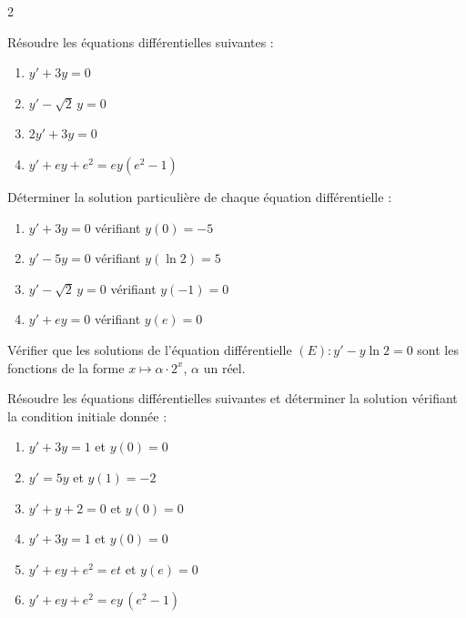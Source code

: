 \clearpage
{}

\begin{multicols*}{2}


\begin{Exercice}
R\'esoudre les \'equations diff\'erentielles suivantes :
\begin{enumerate}[label=\alph*)]
  \item $y'+3y=0$
  \item $y'-\sqrt{2}\,y=0$
  \item $2y'+3y=0$
  \item $y'+ey+e^2=ey(e^2-1)$
\end{enumerate}
\end{Exercice}

\begin{Exercice}
D\'eterminer la solution particuli\`ere de chaque \'equation diff\'erentielle :
\begin{enumerate}[label=\alph*)]
  \item $y'+3y=0$ v\'erifiant $y(0)=-5$
  \item $y'-5y=0$ v\'erifiant $y(\ln 2)=5$
  \item $y'-\sqrt{2}\,y=0$ v\'erifiant $y(-1)=0$
  \item $y'+ey=0$ v\'erifiant $y(e)=0$
\end{enumerate}
\end{Exercice}

\begin{Exercice}
V\'erifier que les solutions de l'\'equation diff\'erentielle
$(E):y'-y\ln 2=0$ sont les fonctions de la forme
$x\mapsto\alpha\cdot 2^x$, $\alpha$ un r\'eel.
\end{Exercice}


\begin{Exercice}
R\'esoudre les \'equations diff\'erentielles suivantes et d\'eterminer la solution v\'erifiant la condition initiale donn\'ee :
\begin{enumerate}[label=\alph*)]
  \item $y'+3y=1$ et $y(0)=0$
  \item $y'=5y$ et $y(1)=-2$
  \item $y'+y+2=0$ et $y(0)=0$
  \item $y'+3y=1$ et $y(0)=0$
  \item $y'+ey+e^2=et$ et $y(e)=0$
  \item $y'+ey+e^2=ey\,(e^2-1)$
\end{enumerate}
\end{Exercice}


\end{multicols*}
